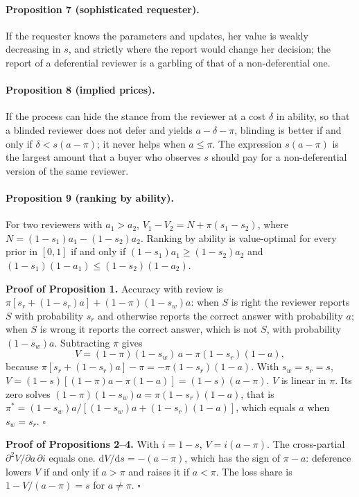 \documentclass[10pt,a4paper]{article}
\begin{document}
\paragraph{Proposition 7 (sophisticated requester).} If the requester knows the parameters and updates, her value is weakly decreasing in $s$, and strictly where the report would change her decision; the report of a deferential reviewer is a garbling of that of a non-deferential one.

\paragraph{Proposition 8 (implied prices).} If the process can hide the stance from the reviewer at a cost $\delta$ in ability, so that a blinded reviewer does not defer and yields $a-\delta-\pi$, blinding is better if and only if $\delta<s(a-\pi)$; it never helps when $a\le\pi$. The expression $s(a-\pi)$ is the largest amount that a buyer who observes $s$ should pay for a non-deferential version of the same reviewer.

\paragraph{Proposition 9 (ranking by ability).} For two reviewers with $a_1>a_2$, $V_1-V_2=N+\pi(s_1-s_2)$, where $N=(1-s_1)a_1-(1-s_2)a_2$. Ranking by ability is value-optimal for every prior in $[0,1]$ if and only if $(1-s_1)a_1\ge(1-s_2)a_2$ and $(1-s_1)(1-a_1)\le(1-s_2)(1-a_2)$.

\bigskip\noindent\textbf{Proof of Proposition 1.} Accuracy with review is $\pi[s_r+(1-s_r)a]+(1-\pi)(1-s_w)a$: when $S$ is right the reviewer reports $S$ with probability $s_r$ and otherwise reports the correct answer with probability $a$; when $S$ is wrong it reports the correct answer, which is not $S$, with probability $(1-s_w)a$. Subtracting $\pi$ gives
\[
V=(1-\pi)(1-s_w)\,a-\pi(1-s_r)(1-a),
\]
because $\pi[s_r+(1-s_r)a]-\pi=-\pi(1-s_r)(1-a)$. With $s_w=s_r=s$, $V=(1-s)[(1-\pi)a-\pi(1-a)]=(1-s)(a-\pi)$. $V$ is linear in $\pi$. Its zero solves $(1-\pi)(1-s_w)a=\pi(1-s_r)(1-a)$, that is $\pi^{*}=(1-s_w)a/[(1-s_w)a+(1-s_r)(1-a)]$, which equals $a$ when $s_w=s_r$. \hfill$\square$

\medskip\noindent\textbf{Proof of Propositions 2--4.} With $i=1-s$, $V=i(a-\pi)$. The cross-partial $\partial^2V/\partial a\,\partial i$ equals one. $\mathrm{d}V/\mathrm{d}s=-(a-\pi)$, which has the sign of $\pi-a$: deference lowers $V$ if and only if $a>\pi$ and raises it if $a<\pi$. The loss share is $1-V/(a-\pi)=s$ for $a\ne\pi$. \hfill$\square$
\end{document}
